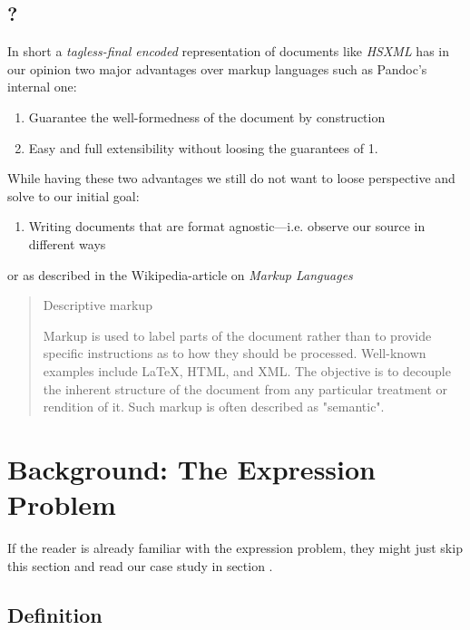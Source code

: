 \subsection{?}

In short a \emph{tagless-final encoded} representation of documents like
\emph{HSXML} has in our opinion two major advantages over markup languages such
as Pandoc’s internal one:

\begin{enumerate}
\item Guarantee the well-formedness of the document by construction
\item Easy and full extensibility without loosing the guarantees of 1.
\end{enumerate}

While having these two advantages we still do not want to loose perspective and
solve to our initial goal:

\begin{enumerate}
\item Writing documents that are format agnostic—i.e. observe our source in
different ways
\end{enumerate}

or as described in the Wikipedia-article on \emph{Markup Languages}

\begin{quote}
Descriptive markup

Markup is used to label parts of the document rather than to provide specific
instructions as to how they should be processed. Well-known examples include
\LaTeX{}, HTML, and XML. The objective is to decouple the inherent structure of
the document from any particular treatment or rendition of it. Such markup is
often described as "semantic".
\end{quote}

\clearpage

\section{Background: The Expression Problem} \label{section_ep}

If the reader is already familiar with the expression problem, they might just
skip this section and read our case study in section
\label{main_section}.

\subsection{Definition}

